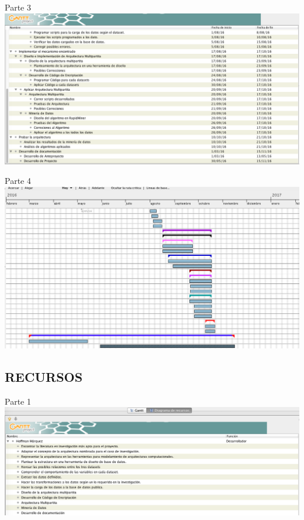 \documentclass[a4paper, 11pt, oneside]{article}
\theoremstyle{definition}
\theoremstyle{remark}
\begin{document}
\begin{table}
\begin{center}
Parte 3
\includegraphics[width=\textwidth]{Imagen2.png}
\end{center}
\end{table}
\clearpage

\begin{table}
\begin{center}
Parte 4
\includegraphics[width=\textwidth]{Imagen4.png}
\end{center}
\end{table}
\clearpage

\begin{table}
\begin{center}
\section{RECURSOS}
\end{center}
\begin{center}
Parte 1
\includegraphics[width=\textwidth]{Hoffman1.png}
\end{center}
\end{table}
\clearpage
\end{document}
